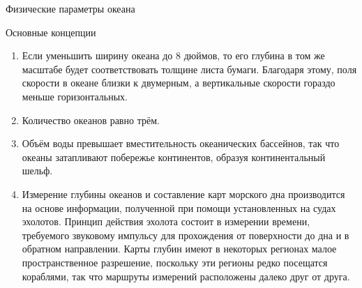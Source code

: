 \begin{chapter}{Физические параметры океана}
\begin{section}{Основные концепции}
\begin{enumerate}
\item
Если уменьшить ширину океана до 8 дюймов, то его глубина в том же масштабе
будет соответствовать толщине листа бумаги. Благодаря этому, поля скорости 
в океане близки к двумерным, а вертикальные скорости гораздо меньше
горизонтальных.
%


\item
Количество океанов равно трём.%
%

\item
Объём воды превышает вместительность океанических бассейнов, так что океаны
затапливают побережье континентов, образуя континентальный шельф.
%

\item
Измерение глубины океанов и составление карт морского дна производится на 
основе информации, полученной при помощи установленных на судах эхолотов.
Принцип действия эхолота состоит в измерении времени, требуемого звуковому
импульсу для прохождения от поверхности до дна и в обратном направлении.
Карты глубин имеют в некоторых регионах малое пространственное разрешение,
поскольку эти регионы редко посещатся кораблями, так что маршруты измерений
расположены далеко друг от друга.
%


\end{enumerate}
\end{section}
\end{chapter}

